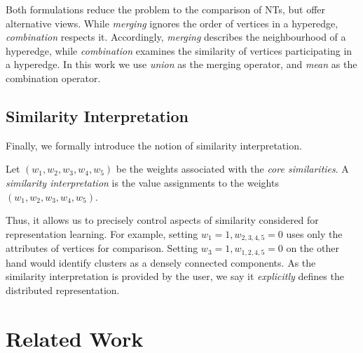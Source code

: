 Both formulations reduce the problem to the comparison of NTs, but offer alternative views.
While \textit{merging} ignores the order of vertices in a hyperedge, \textit{combination} respects it.
Accordingly, \textit{merging} describes the neighbourhood of a hyperedge, while \textit{combination} examines the similarity of vertices participating in a hyperedge.
In this work we use \textit{union} as the merging operator, and \textit{mean} as the combination operator.



\subsection{Similarity Interpretation}

Finally, we formally introduce the notion of similarity interpretation.

\begin{definition}
Let $(w_1,w_2,w_3,w_4,w_5)$ be the weights associated with the \textit{core similarities}.
A \textit{similarity interpretation} is the value assignments to the weights $(w_1,w_2,w_3,w_4,w_5)$. 
\end{definition}

Thus, it allows us to precisely control aspects of similarity considered for representation learning.
For example, setting $w_1 = 1, w_{2,3,4,5} = 0$ uses only the attributes of vertices for comparison.
Setting $w_3 = 1, w_{1,2,4,5} = 0$ on the other hand would identify clusters as a densely connected components. 
As the similarity interpretation is provided by the user, we say it \textit{explicitly} defines the distributed representation.




\section{Related Work}
\label{sec:Related}

